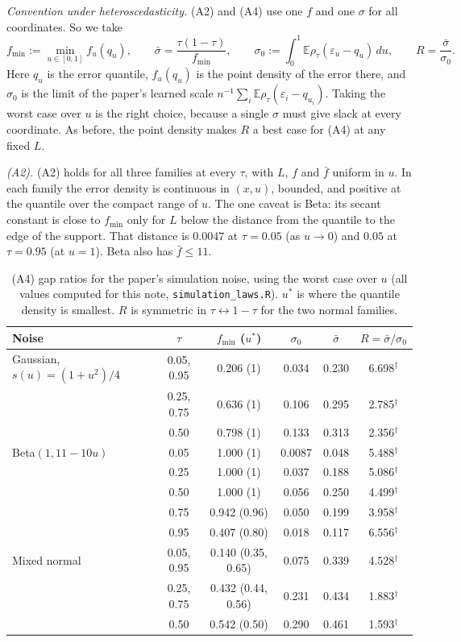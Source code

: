\documentclass[11pt]{article}
\newcommand{\E}{\mathbb{E}}
\newcommand{\sbar}{\bar\sigma}
\theoremstyle{plain}
\theoremstyle{definition}
\theoremstyle{remark}
\begin{document}
\noindent\textit{Convention under heteroscedasticity.} (A2) and (A4) use one $f$ and one $\sigma$ for all coordinates. So we take
\[
f_{\min}:=\min_{u\in[0,1]}f_u(q_u),\qquad \sbar=\frac{\tau(1-\tau)}{f_{\min}},\qquad \sigma_0:=\int_0^1\E\rho_\tau(\varepsilon_u-q_u)\,du,\qquad R=\frac{\sbar}{\sigma_0}.
\]
Here $q_u$ is the error quantile, $f_u(q_u)$ is the point density of the error there, and $\sigma_0$ is the limit of the paper's learned scale $n^{-1}\sum_i\E\rho_\tau(\varepsilon_i-q_{u_i})$. Taking the worst case over $u$ is the right choice, because a single $\sigma$ must give slack at every coordinate. As before, the point density makes $R$ a best case for (A4) at any fixed $L$.

\noindent\textit{(A2).} (A2) holds for all three families at every $\tau$, with $L$, $f$ and $\bar f$ uniform in $u$. In each family the error density is continuous in $(x,u)$, bounded, and positive at the quantile over the compact range of $u$. The one caveat is Beta: its secant constant is close to $f_{\min}$ only for $L$ below the distance from the quantile to the edge of the support. That distance is $0.0047$ at $\tau=0.05$ (as $u\to0$) and $0.05$ at $\tau=0.95$ (at $u=1$). Beta also has $\bar f\le 11$.

\begin{table}[h]
\centering\small
\caption{(A4) gap ratios for the paper's simulation noise, using the worst case over $u$ (all values computed for this note, \texttt{simulation\_laws.R}). $u^*$ is where the quantile density is smallest. $R$ is symmetric in $\tau\leftrightarrow1-\tau$ for the two normal families.}
\label{tab:simnoise}
\begin{tabular}{@{}lccccc@{}}
\toprule
Noise & $\tau$ & $f_{\min}$ ($u^*$) & $\sigma_0$ & $\sbar$ & $R=\sbar/\sigma_0$ \\
\midrule
Gaussian, $s(u)=(1+u^2)/4$ & 0.05, 0.95 & 0.206 (1) & 0.034 & 0.230 & 6.698$^\dagger$ \\
 & 0.25, 0.75 & 0.636 (1) & 0.106 & 0.295 & 2.785$^\dagger$ \\
 & 0.50 & 0.798 (1) & 0.133 & 0.313 & 2.356$^\dagger$ \\
\addlinespace
Beta$(1,11-10u)$ & 0.05 & 1.000 (1) & 0.0087 & 0.048 & 5.488$^\dagger$ \\
 & 0.25 & 1.000 (1) & 0.037 & 0.188 & 5.086$^\dagger$ \\
 & 0.50 & 1.000 (1) & 0.056 & 0.250 & 4.499$^\dagger$ \\
 & 0.75 & 0.942 (0.96) & 0.050 & 0.199 & 3.958$^\dagger$ \\
 & 0.95 & 0.407 (0.80) & 0.018 & 0.117 & 6.556$^\dagger$ \\
\addlinespace
Mixed normal & 0.05, 0.95 & 0.140 (0.35, 0.65) & 0.075 & 0.339 & 4.528$^\dagger$ \\
 & 0.25, 0.75 & 0.432 (0.44, 0.56) & 0.231 & 0.434 & 1.883$^\dagger$ \\
 & 0.50 & 0.542 (0.50) & 0.290 & 0.461 & 1.593$^\dagger$ \\
\bottomrule
\end{tabular}
\end{table}
\end{document}
